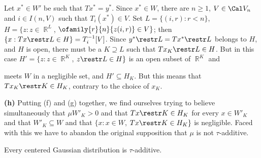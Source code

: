 {Let $x^*\in W'$ be such that $Tx^*=y^*$.   Since $x^*\in W$, there are
$n\ge 1$, $V\in\Cal V_n$ and $i\in I(n,V)$ such that $T_i(x^*)\in V$.
Set $L=\{(i,r):r<n\}$,
$H=\{z:z\in\BbbR^L$, $\ofamily{r}{n}{z(i,r)}\in V\}$;  then
$\{x:Tx\restr L\in H\}=T_i^{-1}[V]$.   Since
$y^*\restr L=Tx^*\restr L$ belongs to $H$, and $H$ is open, there must
be a $K\supseteq L$ such that $Tx_K\restr L\in H$.   But in this case
$H'=\{z:z\in\BbbR^K$, $z\restr L\in H\}$ is an open subset of $\BbbR^K$
and


\noindent meets $W$ in a negligible set, and $H'\subseteq H_K$.   But
this means that $Tx_K\restr K\in H_K$, contrary to the choice of $x_K$.\
\Bang\Qed

\medskip

{\bf (h)} Putting (f) and (g) together, we find ourselves trying to
believe simultaneously that $\mu W'_K>0$ and that $Tx\restr K\in H_K$
for every $x\in W'_K$ and that $W'_K\subseteq W$ and that
$\{x:x\in W$, $Tx\restr K\in H_K\}$ is negligible.   Faced with this we
have to abandon the original supposition that $\mu$ is not
$\tau$-additive.
}%

 Every centered
Gaussian distribution is $\tau$-additive.

